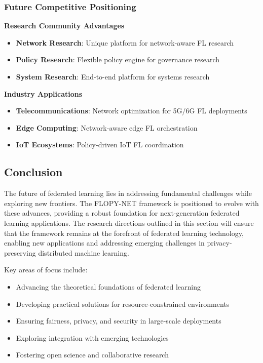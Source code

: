 \subsubsection{Future Competitive Positioning}

\textbf{Research Community Advantages}
\begin{itemize}
    \item \textbf{Network Research}: Unique platform for network-aware FL research
    \item \textbf{Policy Research}: Flexible policy engine for governance research
    \item \textbf{System Research}: End-to-end platform for systems research
\end{itemize}

\textbf{Industry Applications}
\begin{itemize}
    \item \textbf{Telecommunications}: Network optimization for 5G/6G FL deployments
    \item \textbf{Edge Computing}: Network-aware edge FL orchestration
    \item \textbf{IoT Ecosystems}: Policy-driven IoT FL coordination
\end{itemize}

\subsection{Conclusion}

The future of federated learning lies in addressing fundamental challenges while exploring new frontiers. The FLOPY-NET framework is positioned to evolve with these advances, providing a robust foundation for next-generation federated learning applications. The research directions outlined in this section will ensure that the framework remains at the forefront of federated learning technology, enabling new applications and addressing emerging challenges in privacy-preserving distributed machine learning.

Key areas of focus include:
\begin{itemize}
    \item Advancing the theoretical foundations of federated learning
    \item Developing practical solutions for resource-constrained environments
    \item Ensuring fairness, privacy, and security in large-scale deployments
    \item Exploring integration with emerging technologies
    \item Fostering open science and collaborative research
\end{itemize}

